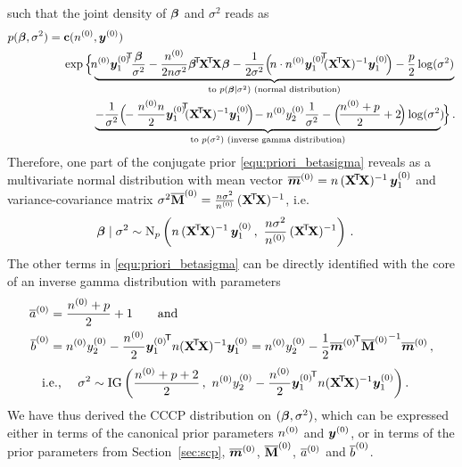 such that the joint density of $\boldsymbol{\beta}$ and $\sigma^2$ reads as
\begin{align}
p(\bbeta,\sigma^2) &= \mbf{c}(\nz, \byz) \nonumber\\ & \hspace*{3ex} 
                      \exp\Big\{\underbrace{\!\! \nz {\byz_1}^{\!\tra}\! \frac{\bbeta}{\sigma^2}
                                            -\frac{\nz}{2n\sigma^2} \bbeta^\tra\! \XtX \bbeta
                                            -\frac{1}{2\sigma^2} \Big(\! n\cdot \nz {\byz_1}^{\!\tra }\!\! (\XtX)^{-1} \byz_1\! \Big)
                                            -\frac{p}{2} \log(\sigma^2)}_{\text{to }p(\bbeta\mid\sigma^2) \text{ (normal distribution)}}
                                                  \nonumber\\ & \hspace*{9ex}
                                \underbrace{-\frac{1}{\sigma^2} \Big(\!\!-\frac{\nz n}{2} {\byz_1}^{\!\tra}\!\! (\XtX)^{-1} \byz_1\! \Big)\!
                                            -\nz  \yz_2 \frac{1}{\sigma^2}
                                            -\Big(\!\frac{\nz + p}{2} + 2\!\Big) \log(\sigma^2)\!\!}_{\text{to } p(\sigma^2) \text{ (inverse gamma distribution)}} \Big\} \,.
\label{equ:priori_betasigma}
\end{align}
Therefore, one part of the conjugate prior \eqref{equ:priori_betasigma} reveals as a
multivariate normal distribution with mean vector
$\overline{{\bm m}}^{(0)} = n\,(\mathbf{X}^{{\mbox{\!\scriptsize\textsf{T}}}} \! \mathbf{X})^{-1}\, {\bm y}^{(0)}_1$ and
variance-covariance matrix $\sigma^2\overline{\mathbf{M}}^{(0)} = \frac{n\sigma^2}{n^{(0)}}\, (\mathbf{X}^{{\mbox{\!\scriptsize\textsf{T}}}} \! \mathbf{X})^{-1}$, i.e.\
\begin{align}\label{equ:priori_betaggsigma}
\boldsymbol{\beta}\mid\sigma^2 &\sim \operatorname{N}_p \left( n\,(\mathbf{X}^{{\mbox{\!\scriptsize\textsf{T}}}} \! \mathbf{X})^{-1}\, {\bm y}^{(0)}_1\,,\ \frac{n\sigma^2}{n^{(0)}}\, (\mathbf{X}^{{\mbox{\!\scriptsize\textsf{T}}}} \! \mathbf{X})^{-1} \right)\,.
\end{align}
The other terms in \eqref{equ:priori_betasigma} can be directly identified with the core of
an inverse gamma distribution with parameters
\begin{align*}
\taz &= \frac{\nz + p}{2} + 1 \qquad \text{and}\\ %
\tbz &= \nz \yz_2 -\frac{\nz}{2} {\byz_1}^\tra n(\XtX)^{-1} \byz_1
      = \nz \yz_2 -\frac{1}{2} {\tmz}^\tra {\tMz}^{-1} \tmz\,,%
\end{align*}
\begin{align}\label{equ:priori_sigma}
\text{i.e., }\quad
\sigma^2 &\sim \operatorname{IG} \bigg( \frac{n^{(0)} + p + 2}{2}\,,\ n^{(0)} y^{(0)}_2 - \frac{n^{(0)}}{2} {{\bm y}^{(0)}_1}^{{\mbox{\!\scriptsize\textsf{T}}}} n(\mathbf{X}^{{\mbox{\!\scriptsize\textsf{T}}}} \! \mathbf{X})^{-1} {\bm y}^{(0)}_1  \bigg)\,.
\end{align}
We have thus derived the CCCP distribution on $(\boldsymbol{\beta},\sigma^2)$,
which can be expressed either in terms of the canonical prior parameters $n^{(0)}$ and ${\bm y}^{(0)}$,
or in terms of the prior parameters from Section~\ref{sec:scp}, $\overline{{\bm m}}^{(0)}$, $\overline{\mathbf{M}}^{(0)}$, $\overline{a}^{(0)}$ and $\overline{b}^{(0)}$.

